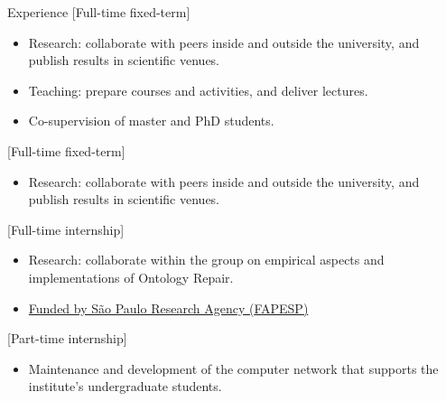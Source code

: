 %

\begin{rSection}{Experience}
    [Full-time fixed-term]{%
        \begin{itemize}[nosep]
            \item Research: collaborate with peers inside and outside the university, and publish results in scientific venues.
            \item Teaching: prepare courses and activities, and deliver lectures.
            \item Co-supervision of master and PhD students.
        \end{itemize}%
    }

    [Full-time fixed-term]{%
        \begin{itemize}[nosep]
            \item Research: collaborate with peers inside and outside the university, and publish results in scientific venues.
        \end{itemize}%
    }

    [Full-time internship]{%
        \begin{itemize}[nosep]
            \item Research: collaborate within the group on empirical aspects and implementations of Ontology Repair.
            \item \href{https://bv.fapesp.br/en/bolsas/176114/improving-efficiency-of-belief-base-change-in-description-logics-with-modularity-in-ontologies/}{Funded by São Paulo Research Agency ({FAPESP})}
        \end{itemize}%
    }

    [Part-time internship]{%
        \begin{itemize}[nosep]
            \item Maintenance and development of the computer network that supports the institute's undergraduate students.
        \end{itemize}%
    }
\end{rSection}
